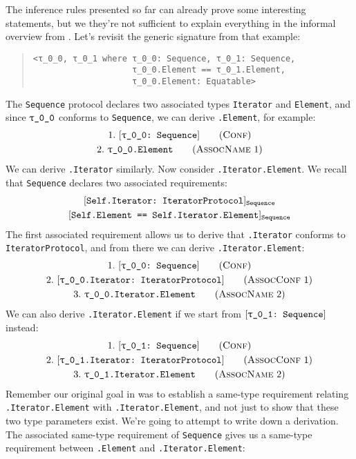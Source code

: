 \documentclass[../generics]{subfiles}
\begin{document}
\begin{example}\label{motivating derived equiv}
The inference rules presented so far can already prove some interesting statements, but we they're not sufficient to explain everything in the informal overview from . Let's revisit the generic signature from that example:
\begin{quote}
\begin{verbatim}
<τ_0_0, τ_0_1 where τ_0_0: Sequence, τ_0_1: Sequence,
                    τ_0_0.Element == τ_0_1.Element,
                    τ_0_0.Element: Equatable>
\end{verbatim}
\end{quote}
The \texttt{Sequence} protocol declares two associated types \texttt{Iterator} and \texttt{Element}, and since $\rT$ conforms to \texttt{Sequence}, we can derive \texttt{\rT.Element}, for example:
\begin{gather*}
\ConfStep{\rT}{Sequence}{1}\\
\AssocNameStep{1}{\rT.Element}{2}
\end{gather*}
We can derive \texttt{\rT.Iterator} similarly. Now consider \texttt{\rT.Iterator.Element}. We recall that \texttt{Sequence} declares two associated requirements:
\begin{gather*}
\AssocConfReq{Self.Iterator}{IteratorProtocol}{Sequence}\\
\AssocSameReq{Self.Element}{Self.Iterator.Element}{Sequence}
\end{gather*}
The first associated requirement allows us to derive that \texttt{\rT.Iterator} conforms to \texttt{IteratorProtocol}, and from there we can derive \texttt{\rT.Iterator.Element}:
\begin{gather*}
\ConfStep{\rT}{Sequence}{1}\\
\AssocConfStep{1}{\rT.Iterator}{IteratorProtocol}{2}\\
\AssocNameStep{2}{\rT.Iterator.Element}{3}
\end{gather*}
We can also derive \texttt{\rU.Iterator.Element} if we start from $\ConfReq{\rU}{Sequence}$ instead:
\begin{gather*}
\ConfStep{\rU}{Sequence}{1}\\
\AssocConfStep{1}{\rU.Iterator}{IteratorProtocol}{2}\\
\AssocNameStep{2}{\rU.Iterator.Element}{3}
\end{gather*}
Remember our original goal in  was to establish a same-type requirement relating \texttt{\rT.Iterator.Element} with \texttt{\rU.Iterator.Element}, and not just to show that these two type parameters exist. We're going to attempt to write down a derivation. The associated same-type requirement of \texttt{Sequence} gives us a same-type requirement between \texttt{\rT.Element} and \texttt{\rT.Iterator.Element}:

\end{example}
\end{document}
